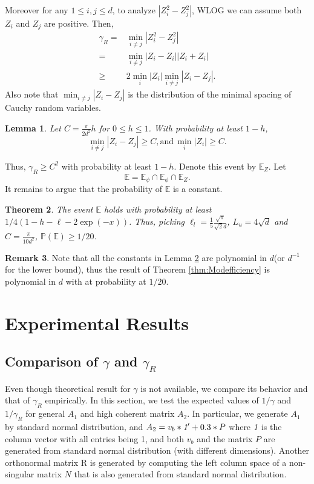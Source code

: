 \documentclass[twoside]{article}
\newcommand{\Ephione}{\mathbb{E}_{\phi_1}}
\newcommand{\Epsi}{\mathbb{E}_{\psi}}
\newcommand{\Ephi}{\mathbb{E}_{\phi}}
\newcommand{\EZ}{\mathbb{E}_{Z}}
\newcommand{\E}{\mathbb{E}}
\newcommand{\Prob}[1]{\mathbb{P}\left(#1\right)}
\newtheorem{lemma}{Lemma}[section]
\newtheorem{thm}[lemma]{Theorem}
\theoremstyle{definition}
\newtheorem{remark}[lemma]{Remark}
\begin{document}
Moreover for any $1\le i, j \le d$, to analyze $\left\vert Z_i^2 - Z_j^2\right\vert
$, WLOG we can assume both $Z_i$ and $Z_j$ are positive. Then, 
\begin{align*}
\gamma_R =	& \min_{i\neq j} \left\vert Z_i^2 - Z_j^2 \right\vert \\
	=		& \min_{i\neq j}\left\vert Z_i - Z_i \right\vert	\left\vert Z_i + Z_i \right\vert \\
	\ge 	& 2\min_i\vert Z_i\vert\min_{i\neq j} \left\vert Z_i - Z_j \right\vert.
\end{align*}
Also note that $\min_{i\neq j} \left\vert Z_i - Z_j \right\vert$ is the distribution of the minimal spacing of Cauchy random variables.

\begin{lemma}
\label{lem:CauchyGap}
Let $C = \frac{\pi}{2d^2}h$ for $0\le h\le 1$. 
With probability at least $1-h$,
\[
\min_{i\neq j} \left\vert Z_i - Z_j \right\vert \ge C, \text{and} \,  \min_i\vert Z_i\vert \ge C.
\]
\end{lemma}
Thus, $\gamma_R \ge C^2$ with probability at least $1-h$.
Denote this event by $\EZ$.
Let  
\[
\E = \Epsi \cap\Ephi \cap \EZ.
\]
It remains to argue that the probability of $\E$ is a constant.
\begin{thm}
\label{thm:ConstantProb}
The event $\E$ holds with probability at least $1/4\left(1-h-\ell-2\exp(-x) \right)$. 
Thus, picking $\ell_l = \frac{1}{5}\frac{\sqrt{\pi}}{\sqrt{2}d}$, $L_u = 4\sqrt{d}$ and $C = \frac{\pi}{10d^2}$, $\Prob{\E}\ge 1/20$.
\end{thm}
\begin{remark}
Note that all the constants in Lemma \ref{thm:ConstantProb} are polynomial in $d$(or $d^{-1}$ for the lower bound), thus the result of Theorem \ref{thm:Modefficiency} is polynomial in $d$ with at probability at $1/20$.
\end{remark}
 
\section{Experimental Results}
\label{sec:ExpRes}
\subsection{Comparison of $\gamma$ and $\gamma_R$}
\label{subsec:comparisonGamma}
Even though theoretical result for $\gamma$ is not available, we compare its behavior and that of $\gamma_R$ empirically. 
In this section, we test the expected values of $1/\gamma$ and $1/\gamma_R$ for general $A_1$ and high coherent matrix $A_2$. 
In particular, we generate $A_1$ by standard normal distribution, and $A_2 = v_b*\emph{1}' + 0.3*P$ where $\emph{1}$ is the column vector with all entries being 1, and both $v_b$ and the matrix $P$ are generated from standard normal distribution (with different dimensions). 
Another orthonormal matrix R is generated by computing the left column space of a non-singular matrix $N$ that is also generated from  standard normal distribution.  
\end{document}

